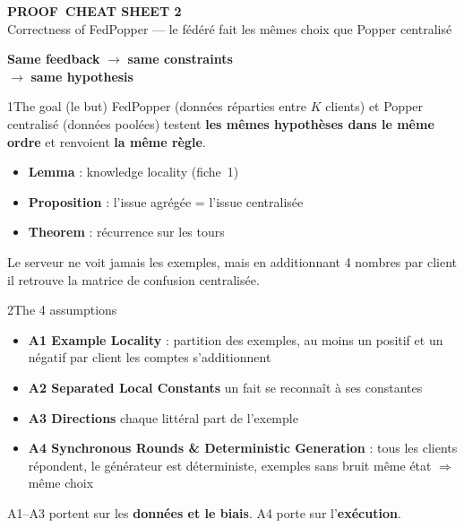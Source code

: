 \documentclass[10pt]{article}
\begin{document}
\begin{minipage}[c]{0.64\textwidth}
  {\fontsize{26}{28}\selectfont\bfseries\textcolor{marine}{PROOF}~CHEAT SHEET 2}\\[1pt]
  {\small Correctness of FedPopper --- le fédéré fait les mêmes choix que Popper centralisé}
\end{minipage}\hfill
\begin{minipage}[c]{0.34\textwidth}\raggedright
  \normalsize \textbf{Same feedback} $\to$ \textbf{same constraints}\\ $\to$ \textbf{same hypothesis}
\end{minipage}

\vspace{5pt}

\begin{minipage}[t]{0.32\textwidth}
\begin{bloc}{\num{1}The goal (le but)}
FedPopper (données réparties entre $K$ clients) et Popper centralisé (données poolées) testent \textbf{les mêmes hypothèses dans le même ordre} et renvoient \textbf{la même règle}.
\begin{itemize}
  \item \textbf{Lemma} : knowledge locality (fiche~1)
  \item \textbf{Proposition} : l'issue agrégée = l'issue centralisée
  \item \textbf{Theorem} : récurrence sur les tours
\end{itemize}
\begin{astuce}
Le serveur ne voit jamais les exemples, mais en additionnant 4 nombres par client il retrouve la matrice de confusion centralisée.
\end{astuce}
\end{bloc}
\end{minipage}\hfill
\begin{minipage}[t]{0.32\textwidth}
\begin{bloc}{\num{2}The 4 assumptions}
\begin{itemize}
  \item \textbf{A1 Example Locality} : partition des exemples, au moins un positif et un négatif par client \fl les comptes s'additionnent
  \item \textbf{A2 Separated Local Constants} \fl un fait se reconnaît à ses constantes
  \item \textbf{A3 Directions} \fl chaque littéral part de l'exemple
  \item \textbf{A4 Synchronous Rounds \& Deterministic Generation} : tous les clients répondent, le générateur est déterministe, exemples sans bruit \fl même état $\Rightarrow$ même choix
\end{itemize}
\begin{astuce}
A1--A3 portent sur les \textbf{données et le biais}. A4 porte sur l'\textbf{exécution}.
\end{astuce}
\end{bloc}
\end{minipage}\hfill
\end{document}
